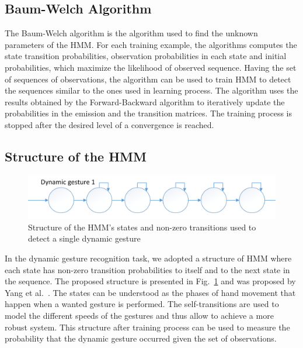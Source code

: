 \subsection{Baum-Welch Algorithm}

The Baum-Welch algorithm is the algorithm used to find the unknown parameters of the HMM.
For each training example, the algorithms computes the state transition probabilities, observation probabilities in each state and initial probabilities, which maximize the likelihood of observed sequence.
Having the set of sequences of observations, the algorithm can be used to train HMM to detect the sequences similar to the ones used in learning process.
The algorithm uses the results obtained by the Forward-Backward algorithm to iteratively update the probabilities in the emission and the transition matrices.
The training process is stopped after the desired level of a convergence is reached.


\subsection{Structure of the HMM}

\begin{figure}[htb]
\centering
 \includegraphics[width=1\columnwidth]{figures/SingleHMM.png}
 \caption{Structure of the HMM's states and non-zero transitions used to detect a single dynamic gesture}
 \label{singlehmm}
\end{figure}

In the dynamic gesture recognition task, we adopted a structure of HMM where each state has non-zero transition probabilities to itself and to the next state in the sequence.
The proposed structure is presented in Fig.~\ref{singlehmm} and was proposed by Yang et al.~\cite{hmm}.
The states can be understood as the phases of hand movement that happen when a wanted gesture is performed.
The self-transitions are used to model the different speeds of the gestures and thus allow to achieve a more robust system.
This structure after training process can be used to measure the probability that the dynamic gesture occurred given the set of observations.

